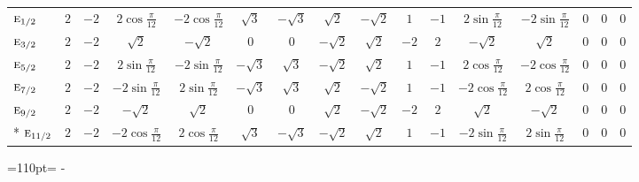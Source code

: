 \documentclass[10pt,a4paper]{article}
\newcommand{\needspace}[1]{\par\penalty-100\begingroup\dimen0=#1\relax\dimen2=\pagegoal
  \advance\dimen2-\pagetotal\ifdim\dimen0>\dimen2\relax\ifdim\dimen2>0pt\vfil\break\fi\fi
  \endgroup}
\numberwithin{equation}{section}
\newcommand{\irr}[1]{\text{\normalfont\scshape #1}}
\begin{document}
{{\begin{longtable}{@{}lccccccccccccccc@{}}
$\irr{e}_{1/2}$ & $2$ & $-2$ & $2\cos\tfrac{\pi}{12}$ & $-2\cos\tfrac{\pi}{12}$ & $\sqrt{3}$ & $-\sqrt{3}$ & $\sqrt{2}$ & $-\sqrt{2}$ & $1$ & $-1$ & $2\sin\tfrac{\pi}{12}$ & $-2\sin\tfrac{\pi}{12}$ & $0$ & $0$ & $0$\\
$\irr{e}_{3/2}$ & $2$ & $-2$ & $\sqrt{2}$ & $-\sqrt{2}$ & $0$ & $0$ & $-\sqrt{2}$ & $\sqrt{2}$ & $-2$ & $2$ & $-\sqrt{2}$ & $\sqrt{2}$ & $0$ & $0$ & $0$\\
$\irr{e}_{5/2}$ & $2$ & $-2$ & $2\sin\tfrac{\pi}{12}$ & $-2\sin\tfrac{\pi}{12}$ & $-\sqrt{3}$ & $\sqrt{3}$ & $-\sqrt{2}$ & $\sqrt{2}$ & $1$ & $-1$ & $2\cos\tfrac{\pi}{12}$ & $-2\cos\tfrac{\pi}{12}$ & $0$ & $0$ & $0$\\
$\irr{e}_{7/2}$ & $2$ & $-2$ & $-2\sin\tfrac{\pi}{12}$ & $2\sin\tfrac{\pi}{12}$ & $-\sqrt{3}$ & $\sqrt{3}$ & $\sqrt{2}$ & $-\sqrt{2}$ & $1$ & $-1$ & $-2\cos\tfrac{\pi}{12}$ & $2\cos\tfrac{\pi}{12}$ & $0$ & $0$ & $0$\\
$\irr{e}_{9/2}$ & $2$ & $-2$ & $-\sqrt{2}$ & $\sqrt{2}$ & $0$ & $0$ & $\sqrt{2}$ & $-\sqrt{2}$ & $-2$ & $2$ & $\sqrt{2}$ & $-\sqrt{2}$ & $0$ & $0$ & $0$\\*
$\irr{e}_{11/2}$ & $2$ & $-2$ & $-2\cos\tfrac{\pi}{12}$ & $2\cos\tfrac{\pi}{12}$ & $\sqrt{3}$ & $-\sqrt{3}$ & $-\sqrt{2}$ & $\sqrt{2}$ & $1$ & $-1$ & $-2\sin\tfrac{\pi}{12}$ & $2\sin\tfrac{\pi}{12}$ & $0$ & $0$ & $0$\\
\bottomrule\end{longtable}}}
\needspace{110pt}
\end{document}
